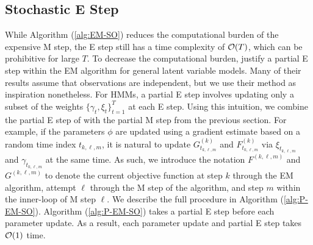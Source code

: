 \subsection{Stochastic E Step}
\label{subsec:stoch_E}

While Algorithm (\ref{alg:EM-SO}) reduces the computational burden of the expensive M step, the E step still has a time complexity of $\mathcal{O}(T)$, which can be prohibitive for large $T$. To decrease the computational burden, \citet{Neal:1998} justify a partial E step within the EM algorithm for general latent variable models. Many of their results assume that observations are independent, but we use their method as inspiration nonetheless. For HMMs, a partial E step involves updating only a subset of the weights $\{\gamma_t,\xi_t\}_{t=1}^T$ 
at each E step. Using this intuition, we combine the partial E step of \citet{Neal:1998} with the partial M step from the previous section. For example, if the parameters $\phi$ are updated using a gradient estimate based on a random time index $t_{k,\ell,m}$, it is natural to update $G_{t_{k,\ell,m}}^{(k)}$ and $F_{t_{k,\ell,m}}^{(k)}$ via $\xi_{t_{k,\ell,m}}$ and $\gamma_{t_{k,\ell,m}}$ at the same time. As such, we introduce the notation $F^{(k,\ell,m)}$ and $G^{(k,\ell,m)}$ to denote the current objective function at step $k$ through the EM algorithm, attempt $\ell$ through the M step of the algorithm, and step $m$ within the inner-loop of M step $\ell$. We describe the full procedure in Algorithm (\ref{alg:P-EM-SO}). Algorithm (\ref{alg:P-EM-SO}) takes a partial E step before each parameter update. As a result, each parameter update and partial E step takes $\mathcal{O}(1)$ time.


